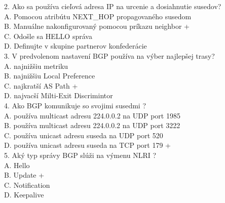 \documentclass[12pt,twoside,a4paper]{report}
\begin{document}
2. Ako sa používa cieľová adresa IP na urcenie a dosiahnutie susedov?\\
A. Pomocou atribútu NEXT\_HOP propagovaného susedom\\
B. Manuálne nakonfigurovaný pomocou príkazu neighbor +\\
C. Odošle sa HELLO správa \\
D. Definujte v skupine partnerov konfederácie\\

3. V predvolenom nastavení BGP používa na výber najlepšej trasy?\\
A. najnižšiu metriku\\
B. najnižšiu Local Preference\\
C. najkratší AS Path +\\
D. najvacší Milti-Exit Discrimintor\\

4. Ako BGP komunikuje so svojimi susedmi ?\\
A. používa multicast adresu 224.0.0.2 na UDP port 1985\\
B. používa multicast adresu 224.0.0.2 na UDP port 3222\\
C. používa unicast adresu suseda na UDP port 520\\
D. používa unicast adresu suseda na TCP port 179 +\\

5. Aký typ správy BGP slúži na výmenu NLRI ?\\
A. Hello\\
B. Update +\\
C. Notification\\
D. Keepalive\\
\end{document}
